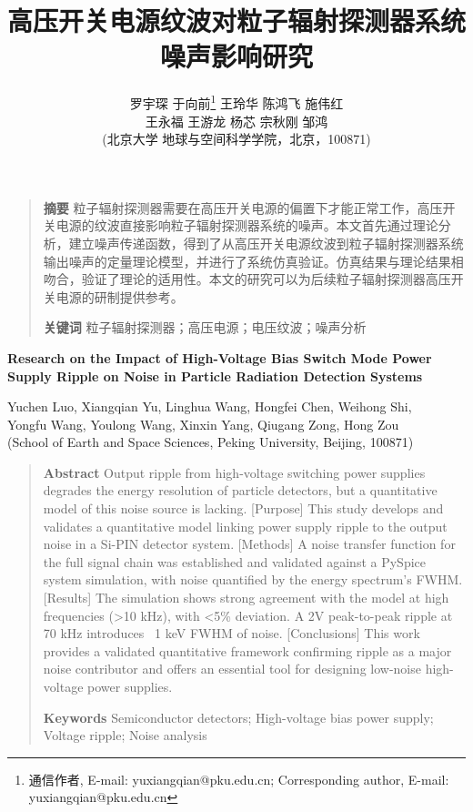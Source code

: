 \documentclass{ctexart}
\title{高压开关电源纹波对粒子辐射探测器系统噪声影响研究}
\author{
    罗宇琛 \quad 于向前\thanks{通信作者, E-mail: yuxiangqian@pku.edu.cn; Corresponding author, E-mail: yuxiangqian@pku.edu.cn} \quad 王玲华 \quad 陈鸿飞 \quad 施伟红 \\ 王永福 \quad 王游龙 \quad 杨芯 \quad 宗秋刚 \quad 邹鸿 \\[0.5ex]
    \small{(北京大学 地球与空间科学学院，北京，100871)}
}
\date{}
\begin{document}
\maketitle
\thispagestyle{empty}
\begin{quote}
    \noindent\textbf{摘要} \quad 粒子辐射探测器需要在高压开关电源的偏置下才能正常工作，高压开关电源的纹波直接影响粒子辐射探测器系统的噪声。本文首先通过理论分析，建立噪声传递函数，得到了从高压开关电源纹波到粒子辐射探测器系统输出噪声的定量理论模型，并进行了系统仿真验证。仿真结果与理论结果相吻合，验证了理论的适用性。本文的研究可以为后续粒子辐射探测器高压开关电源的研制提供参考。
    \vspace{0em}
    
    \noindent\textbf{关键词} \quad 粒子辐射探测器；高压电源；电压纹波；噪声分析
\end{quote}

\vspace{0em}

\begin{center}
    \large\bfseries Research on the Impact of High-Voltage Bias Switch Mode Power Supply Ripple on Noise in Particle Radiation Detection Systems
\end{center}
\vspace{0em}

\begin{center}
    Yuchen Luo, \quad Xiangqian Yu\footnotemark[1], \quad Linghua Wang, \quad Hongfei Chen, \quad Weihong Shi, \\
    Yongfu Wang, \quad Youlong Wang, \quad Xinxin Yang, \quad Qiugang Zong, \quad Hong Zou \\[0.5ex]
    \small{(School of Earth and Space Sciences, Peking University, Beijing, 100871)}
\end{center}
\vspace{0em}

\begin{quote}
    \noindent\textbf{Abstract} \quad [Background] Output ripple from high-voltage switching power supplies degrades the energy resolution of particle detectors, but a quantitative model of this noise source is lacking. [Purpose] This study develops and validates a quantitative model linking power supply ripple to the output noise in a Si-PIN detector system. [Methods] A noise transfer function for the full signal chain was established and validated against a PySpice system simulation, with noise quantified by the energy spectrum's FWHM. [Results] The simulation shows strong agreement with the model at high frequencies (>10 kHz), with <5\% deviation. A 2V peak-to-peak ripple at 70 kHz introduces ~1 keV FWHM of noise. [Conclusions] This work provides a validated quantitative framework confirming ripple as a major noise contributor and offers an essential tool for designing low-noise high-voltage power supplies.
    \vspace{0em}
    
    \noindent\textbf{Keywords} \quad Semiconductor detectors; High-voltage bias power supply; Voltage ripple; Noise analysis
\end{quote}
\end{document}
